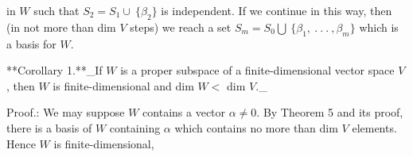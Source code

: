 in \(W\) such that \(S_{2}=S_{1}\cup\ \{\beta_{2}\}\) is independent. If we continue in this way, then (in not more than dim \(V\) steps) we reach a set \(S_{m}=S_{0}\bigcup\ \{\beta_{1},\ .\ .\ .\ ,\beta_{m}\}\) which is a basis for \(W\).

**Corollary 1.**_If \(W\) is a proper subspace of a finite-dimensional vector space \(V\), then \(W\) is finite-dimensional and dim \(W<\) dim \(V\)._

Proof.: We may suppose \(W\) contains a vector \(\alpha\neq 0\). By Theorem 5 and its proof, there is a basis of \(W\) containing \(\alpha\) which contains no more than dim \(V\) elements. Hence \(W\) is finite-dimensional, 